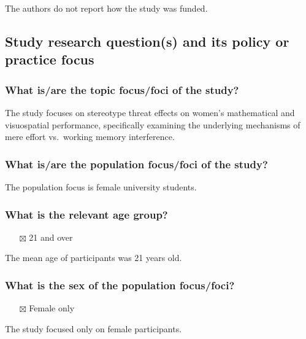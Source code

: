 \documentclass[
  doc, a4paper]{apa7}
\providecommand{\tightlist}{%
  \setlength{\itemsep}{0pt}\setlength{\parskip}{0pt}}
\begin{document}
The authors do not report how the study was funded.

\subsection{Study research question(s) and its policy or practice focus}\label{study-research-questions-and-its-policy-or-practice-focus}

\subsubsection{What is/are the topic focus/foci of the study?}\label{what-isare-the-topic-focusfoci-of-the-study}

The study focuses on stereotype threat effects on women's mathematical and visuospatial performance, specifically examining the underlying mechanisms of mere effort vs.~working memory interference.

\subsubsection{What is/are the population focus/foci of the study?}\label{what-isare-the-population-focusfoci-of-the-study}

The population focus is female university students.

\subsubsection{What is the relevant age group?}\label{what-is-the-relevant-age-group}

\begin{itemize}
\tightlist
\item[$\boxtimes$]
  21 and over
\end{itemize}

The mean age of participants was 21 years old.

\subsubsection{What is the sex of the population focus/foci?}\label{what-is-the-sex-of-the-population-focusfoci}

\begin{itemize}
\tightlist
\item[$\boxtimes$]
  Female only
\end{itemize}

The study focused only on female participants.
\end{document}
